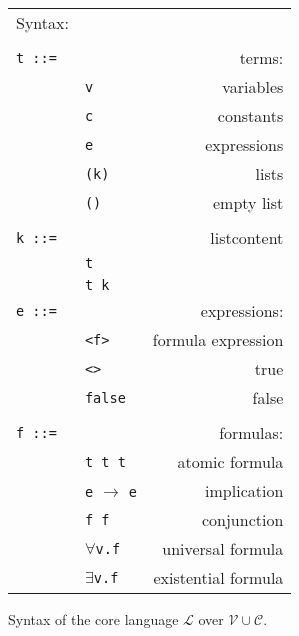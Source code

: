 \begin{figure}

\begin{tabular}{llr}
\hline
Syntax: &&\\
&&\\
\texttt{t ::=}&&                    terms:\\
      & \texttt{v}\hspace{0.5\textwidth} &                variables\\
      & \texttt{c} &                constants\\
      & \texttt{e} &                 expressions\\
      & \texttt{(k)}& lists\\
      & \texttt{()}& empty list\\
      &&\\
\texttt{k ::=}&&                    listcontent\\  
       &\texttt{t}  &\\
       &\texttt{t k}&\\
\texttt{e ::=}&&                    expressions:\\
       &\texttt{<f>} &               formula expression\\
       &\texttt{<>} & true\\
       &\texttt{false}       &               false\\
       &&\\
\texttt{f ::= } & &                   formulas:\\  
    &  \texttt{t t t}&                atomic formula\\
    &  \texttt{e} $\rightarrow$ \texttt{e}& implication\\
    &  \texttt{f f} &                 conjunction\\
    &  \(\forall\)\texttt{v.f}     & universal formula\\
    &  \(\exists\)\texttt{v.f}     & existential formula\\
    \hline
\end{tabular}
\caption{Syntax of the core language $\mathcal{L}$ over $\mathcal{V}\cup\mathcal{C}$.\label{syntax}}
\end{figure}

